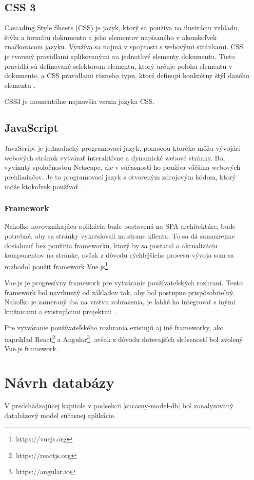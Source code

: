 \subsection{CSS 3}
Cascading Style Sheets (CSS) je jazyk, ktorý sa používa na ilustráciu vzhľadu, štýlu a formátu dokumentu a jeho elementov napísaného v akomkoľvek značkovacom jazyku. Využíva sa najmä v spojitosti s webovými stránkami. CSS je tvorený pravidlami aplikovanými na jednotlivé elementy dokumentu. Tieto pravidlá sú definované selektorom elementu, ktorý určuje polohu elementu v dokumente, a CSS pravidlami rôzneho typu, ktoré definujú konkrétny štýl daného elementu \cite{co-je-css}. 

CSS3 je momentálne najnovšia verzia jazyka CSS.

\subsection{JavaScript}
JavaScript je jednoduchý programovací jazyk, pomocou ktorého môžu vývojári webových stránok vytvárať interaktívne a dynamické webové stránky. Bol vyvinutý spoločnosťou Netscape, ale v súčasnosti ho používa väčšina webových prehliadačov. Je to programovací jazyk s otvoreným zdrojovým kódom, ktorý môže ktokoľvek používať \cite{co-je-js}.

\subsubsection*{Framework}
Nakoľko novovznikajúca aplikácia bude postavená na SPA architektúre, bude potrebné, aby sa stránky vykresľovali na strane klienta. To sa dá samozrejme dosiahnuť bez použitia frameworku, ktorý by sa postaral o aktualizáciu komponentov na stránke, avšak z dôvodu rýchlejšieho procesu vývoja som sa rozhodol použiť framework Vue.js\footnote{https://vuejs.org}.

Vue.js je progresívny framework pre vytváranie používateľských rozhraní. Tento framework bol navrhnutý od základov tak, aby bol postupne prispôsobiteľný. Nakoľko je zameraný iba na vrstvu zobrazenia, je ľahké ho integrovať s inými knižnicami a existujúcimi projektmi \cite{co-je-vue}.

Pre vytváranie používateľského rozhrania existujú aj iné frameworky, ako napríklad React\footnote{https://reactjs.org} a Angular\footnote{https://angular.io}, avšak z dôvodu doterajších skúseností bol zvolený Vue.js framework.

\section{Návrh databázy}
V predchádzajúcej kapitole v podsekcii \ref{sucasny-model-db} bol zanalyzovaný databázový model súčasnej aplikácie.

